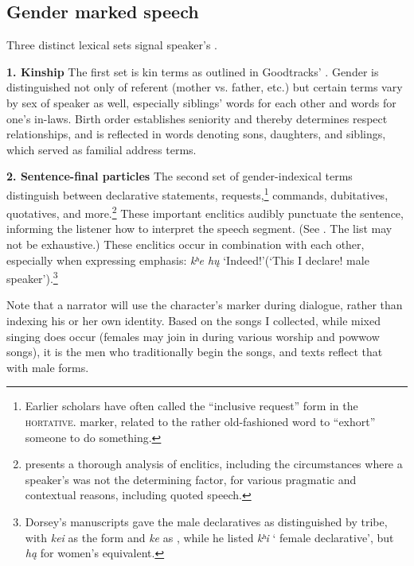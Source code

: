 \documentclass[output=paper]{LSP/langsci}
\begin{document}
\subsection{Gender marked speech} Three distinct lexical sets signal speaker's .  

\textbf{1.  Kinship}  The first set is kin terms as outlined in Goodtracks' . Gender is distinguished not only of referent (mother vs. father, etc.) but certain terms vary by sex of speaker as well, especially siblings' words for each other and words for one's in-laws.  Birth order establishes seniority and thereby determines respect relationships, and is reflected in words denoting sons, daughters, and siblings, which served as familial address terms.

\textbf{2. Sentence-final particles} The second set of gender-indexical terms distinguish between declarative statements, requests,\footnote{Earlier scholars have often called the ``inclusive request'' form in  the \textsc{hortative.} marker, related to the rather old-fashioned word to ``exhort'' someone to do something.}  commands, dubitatives, quotatives, and more.\footnote{\citet{Trechter1995} presents a thorough analysis of  enclitics, including the circumstances where a speaker's  was not the determining factor, for various pragmatic and contextual reasons, including quoted speech.} These important enclitics audibly punctuate the sentence, informing the listener how to interpret the speech segment.   (See . The list may not be exhaustive.) These enclitics occur in combination with each other, especially when expressing emphasis: \textit{kʰe h\k{u}} `Indeed!'(`This I declare! male speaker').\footnote{Dorsey's manuscripts \citeyearpar{DorseyNDChiwere} gave the male declaratives as distinguished by tribe, with \textit{kei} as the  form and \textit{ke} as , while he listed \textit{kʰi} ` female declarative', but \textit{h\k{a}} for  women's equivalent.} 

Note that a narrator will use the character's  marker during dialogue, rather than indexing his or her own identity. Based on the songs I collected, while mixed  singing does occur (females may join in during various worship and powwow songs), it is the men who traditionally begin the songs, and texts reflect that with male forms.  
\end{document}
